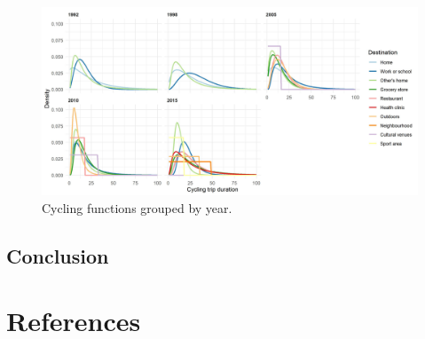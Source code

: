 \documentclass[preprint, 3p,
authoryear]{elsarticle} %
\begin{document}
\begin{figure}

{\centering \includegraphics[width=1\linewidth]{figures/cycling_functions_by_year} 

}

\caption{Cycling functions grouped by year.}\label{fig:cycling-function-by-year-fig}
\end{figure}

\hypertarget{conclusion}{%
\subsection{Conclusion}\label{conclusion}}

\hypertarget{references}{%
\section*{References}\label{references}}
\end{document}
